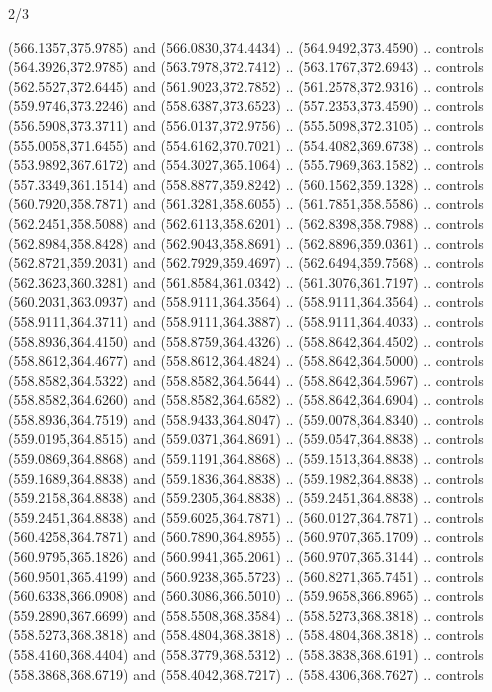 \begin{flagdescription}{2/3}
\begin{scope}[xshift=0.5\flaglength,yshift=0.5\flagwidth,scale=\flagwidth/495.65]
\begin{scope}[y=0.8pt, x=0.8pt, yscale=-1,shift={(-463.76,-309.78)}]
  (566.1357,375.9785) and (566.0830,374.4434) .. (564.9492,373.4590) .. controls
  (564.3926,372.9785) and (563.7978,372.7412) .. (563.1767,372.6943) .. controls
  (562.5527,372.6445) and (561.9023,372.7852) .. (561.2578,372.9316) .. controls
  (559.9746,373.2246) and (558.6387,373.6523) .. (557.2353,373.4590) .. controls
  (556.5908,373.3711) and (556.0137,372.9756) .. (555.5098,372.3105) .. controls
  (555.0058,371.6455) and (554.6162,370.7021) .. (554.4082,369.6738) .. controls
  (553.9892,367.6172) and (554.3027,365.1064) .. (555.7969,363.1582) .. controls
  (557.3349,361.1514) and (558.8877,359.8242) .. (560.1562,359.1328) .. controls
  (560.7920,358.7871) and (561.3281,358.6055) .. (561.7851,358.5586) .. controls
  (562.2451,358.5088) and (562.6113,358.6201) .. (562.8398,358.7988) .. controls
  (562.8984,358.8428) and (562.9043,358.8691) .. (562.8896,359.0361) .. controls
  (562.8721,359.2031) and (562.7929,359.4697) .. (562.6494,359.7568) .. controls
  (562.3623,360.3281) and (561.8584,361.0342) .. (561.3076,361.7197) .. controls
  (560.2031,363.0937) and (558.9111,364.3564) .. (558.9111,364.3564) .. controls
  (558.9111,364.3711) and (558.9111,364.3887) .. (558.9111,364.4033) .. controls
  (558.8936,364.4150) and (558.8759,364.4326) .. (558.8642,364.4502) .. controls
  (558.8612,364.4677) and (558.8612,364.4824) .. (558.8642,364.5000) .. controls
  (558.8582,364.5322) and (558.8582,364.5644) .. (558.8642,364.5967) .. controls
  (558.8582,364.6260) and (558.8582,364.6582) .. (558.8642,364.6904) .. controls
  (558.8936,364.7519) and (558.9433,364.8047) .. (559.0078,364.8340) .. controls
  (559.0195,364.8515) and (559.0371,364.8691) .. (559.0547,364.8838) .. controls
  (559.0869,364.8868) and (559.1191,364.8868) .. (559.1513,364.8838) .. controls
  (559.1689,364.8838) and (559.1836,364.8838) .. (559.1982,364.8838) .. controls
  (559.2158,364.8838) and (559.2305,364.8838) .. (559.2451,364.8838) .. controls
  (559.2451,364.8838) and (559.6025,364.7871) .. (560.0127,364.7871) .. controls
  (560.4258,364.7871) and (560.7890,364.8955) .. (560.9707,365.1709) .. controls
  (560.9795,365.1826) and (560.9941,365.2061) .. (560.9707,365.3144) .. controls
  (560.9501,365.4199) and (560.9238,365.5723) .. (560.8271,365.7451) .. controls
  (560.6338,366.0908) and (560.3086,366.5010) .. (559.9658,366.8965) .. controls
  (559.2890,367.6699) and (558.5508,368.3584) .. (558.5273,368.3818) .. controls
  (558.5273,368.3818) and (558.4804,368.3818) .. (558.4804,368.3818) .. controls
  (558.4160,368.4404) and (558.3779,368.5312) .. (558.3838,368.6191) .. controls
  (558.3868,368.6719) and (558.4042,368.7217) .. (558.4306,368.7627) .. controls

\end{scope}
\end{scope}
\end{flagdescription}
